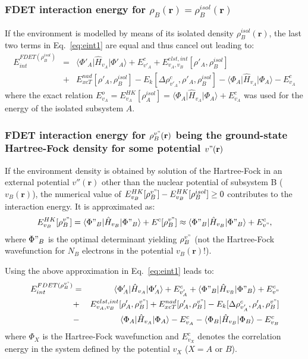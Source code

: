 \documentclass[journal=jctcce,manuscript=article]{achemso}
\newcommand{\nr}[1]{\color{red}#1\color{black}}
\begin{document}
\subsubsection{FDET interaction energy for $\rho_B(\mathbf{r})=\rho_B^{isol}(\mathbf{r})$}
\nr{If the environment is modelled by means of its isolated density $\rho_B^{isol}(\mathbf{r})$}, the last two terms in Eq.~\ref{eq:eint1} are equal \nr{and thus cancel out } leading to:
\begin{eqnarray}
E_{int}^{FDET(\rho_B^{isol})}&=&
\langle\Phi'_{A}\vert \hat{H}_{v_A}\vert \Phi'_{A}\rangle + E^{c}_{v'_A}
+ E^{elst,int}_{v_A,v_B}[\rho'_A,\rho_B^{isol}]  \label{eq:eint2}\\
&+& {E}_{xcT}^{nad}[\rho'_A,\rho_B^{isol}]     - E_k[\Delta \rho^{c}_{v'_A}, \rho'_A, \rho_B^{isol}]  - 
\langle\Phi_{A}\vert \hat{H}_{v_A}\vert \Phi_{A}\rangle - E^{c}_{v_A}
\nonumber
\end{eqnarray}
where the exact relation $E_{v_A}^o=E_{v_A}^{HK}[\rho_A^{isol}]=\langle\Phi_{A}\vert \hat{H}_{v_A}\vert \Phi_{A}\rangle + E^{c}_{v_A}$ was used for the energy of the isolated subsystem $A$.

\subsubsection{FDET interaction energy for  $\rho_B^{v"}(\mathbf{r})$ being the ground-state Hartree-Fock density for some 
 potential $v"(\mathbf{r})$} 
\nr{If the environment density is obtained by solution of the Hartree-Fock in an external potential $v''(\mathbf{r})$ other than the nuclear potential of subsystem B ($v_B(\mathbf{r})$)}, the numerical value of 
${E}^{HK}_{v_B}[\rho_B^{v"}]-{E}^{HK}_{v_B}[\rho_B^{isol}]\ge 0$ contributes to the interaction energy. 
It \nr{is } approximated as:
\begin{eqnarray}
{E}^{HK}_{v_B}[\rho_B^{v"}]=\langle\Phi"_{B}\vert \hat{H}_{v_B}\vert \Phi"_{B}\rangle+E^{c}[\rho_B^{v"}] \approx \langle\Phi"_{B}\vert \hat{H}_{v_B}\vert \Phi"_{B}\rangle+E^{c}_{v"},   \label{eq:evb} 
\end{eqnarray}
where $\Phi"_{B}$ is the optimal determinant yielding $\rho_B^{v"}$ (not the Hartree-Fock wavefunction for $N_B$ electrons in the potential ${v_B}(\mathbf{r})$!).

Using the above approximation in Eq.~\ref{eq:eint1} leads to:
 \begin{eqnarray}
E_{int}^{FDET(\rho_B^{v"})} 
&=&  \langle\Phi'_{A}\vert \hat{H}_{v_A}\vert \Phi'_{A}\rangle + E^{c}_{v'_A} + \langle\Phi"_{B}\vert \hat{H}_{v_B}\vert \Phi"_{B}\rangle  + E^{c}_{v"} \label{eq:eint3}\\ \nonumber
&+& E^{elst,int}_{v_A,v_B}[\rho'_A,\rho_B^{v"}] + {E}_{xcT}^{nad}[\rho'_A,\rho_B^{v"}]-     E_k[\Delta \rho^{c}_{v'_A}, \rho'_A, \rho_B^{v"}]  \nonumber\\
&-& 
\langle\Phi_{A}\vert \hat{H}_{v_A}\vert \Phi_{A}\rangle - E^{c}_{v_A}
- \langle\Phi_{B}\vert \hat{H}_{v_B}\vert \Phi_{B}\rangle - E^{c}_{v_B}\nonumber
\end{eqnarray}
where $\Phi_{X}$ is the Hartree-Fock wavefunction and  $E^{c}_{v_X}$ denotes the correlation energy in the system defined by the potential $v_X$ ($X=A$ or $B$).
\end{document}

